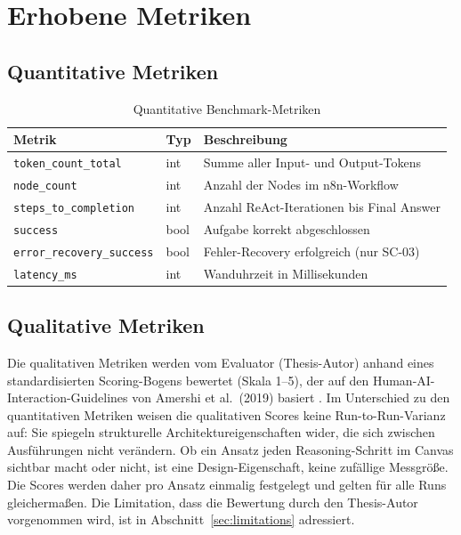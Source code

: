 \documentclass[12pt,a4paper,oneside]{report}
\begin{document}
\section{Erhobene Metriken}

\subsection{Quantitative Metriken}

\begin{table}[H]
  \centering
  \caption{Quantitative Benchmark-Metriken}
  \label{tab:metrics-quant}
  \begin{tabularx}{\textwidth}{llX}
    \toprule
    \textbf{Metrik} & \textbf{Typ} & \textbf{Beschreibung} \\
    \midrule
    \texttt{token\_count\_total}    & int  & Summe aller Input- und Output-Tokens \\
    \texttt{node\_count}            & int  & Anzahl der Nodes im n8n-Workflow \\
    \texttt{steps\_to\_completion}  & int  & Anzahl ReAct-Iterationen bis Final Answer \\
    \texttt{success}                & bool & Aufgabe korrekt abgeschlossen \\
    \texttt{error\_recovery\_success} & bool & Fehler-Recovery erfolgreich (nur SC-03) \\
    \texttt{latency\_ms}            & int  & Wanduhrzeit in Millisekunden \\
    \bottomrule
  \end{tabularx}
\end{table}

\subsection{Qualitative Metriken}
\label{sec:qualitative-metriken}

Die qualitativen Metriken werden vom Evaluator (Thesis-Autor) anhand eines
standardisierten Scoring-Bogens bewertet (Skala 1--5), der auf den
Human-AI-Interaction-Guidelines von Amershi et al.\ (2019) basiert \cite{amershi2019guidelines}.
Im Unterschied zu den quantitativen Metriken weisen die qualitativen Scores keine
Run-to-Run-Varianz auf: Sie spiegeln strukturelle Architektureigenschaften wider, die
sich zwischen Ausführungen nicht verändern. Ob ein Ansatz jeden Reasoning-Schritt im
Canvas sichtbar macht oder nicht, ist eine Design-Eigenschaft, keine zufällige
Messgröße. Die Scores werden daher pro Ansatz einmalig festgelegt und gelten für alle
Runs gleichermaßen. Die Limitation, dass die Bewertung durch den Thesis-Autor vorgenommen
wird, ist in Abschnitt~\ref{sec:limitations} adressiert.
\end{document}
